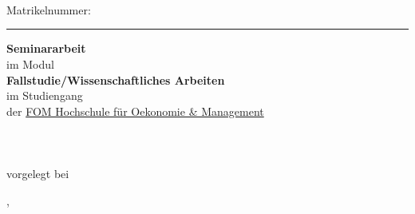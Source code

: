 \begin{titlepage}
\begin{center}
\begin{spacing}{1.8}
    {\sffamily\bfseries\LARGE\daTitelEins}\\ %
    {\sffamily\bfseries\LARGE\daTitelZwei}\\ %
	{\sffamily\LARGE\daAutor}\\ %
	{\sffamily\large Matrikelnummer: \daMatrikelnummer}\\ %
  \end{spacing}%
  \hrule
  \begin{spacing}{1.1}
    {\sffamily\bfseries\Large Seminararbeit}\\ %
    {\large im Modul}\\
    {\large\bfseries Fallstudie/Wissenschaftliches Arbeiten}\\
  	{\large im Studiengang {\large \daStudiengang}} \\%
  	{\large der \href{\daUniURL}{FOM Hochschule für Oekonomie \& Management}} \\%
    {\normalsize\daAutor}\\%
    {\normalsize\daAutorAdresse}\\%
    {\normalsize\daAutorPLZ~\daAutorOrt}\\%
    {\small vorgelegt bei}\\%
    {\normalsize\daGutachterEins}\par%
  \end{spacing}
  {\normalsize \daAutorOrt, \daDate}
\end{center}

\setlength{\spalteZwei}{\textwidth}
\addtolength{\spalteZwei}{-\spalteEins}


\end{titlepage}
